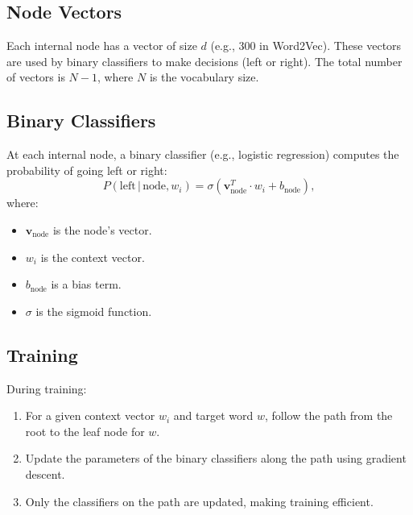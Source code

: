 \begin{notechapter}
\subsection{Node Vectors}
Each internal node has a vector of size \( d \) (e.g., 300
in Word2Vec). These vectors are used by binary classifiers
to make decisions (left or right). The total number of
vectors is \( N-1 \), where \( N \) is the vocabulary size.

\subsection{Binary Classifiers}
At each internal node, a binary classifier (e.g., logistic
regression) computes the probability of going left or right:
\[
P(\text{left} \,|\, \text{node}, w_i) = \sigma(\mathbf{v}_{\text{node}}^T
\cdot w_i + b_{\text{node}}),
\]
where:
\begin{itemize}
    \item \( \mathbf{v}_{\text{node}} \) is the node's vector.
    \item \( w_i \) is the context vector.
    \item \( b_{\text{node}} \) is a bias term.
    \item \( \sigma \) is the sigmoid function.
\end{itemize}

\subsection{Training}
During training:
\begin{enumerate}
    \item For a given context vector \( w_i \) and target word \( w \),
          follow the path from the root to the leaf node for \( w \).
    \item Update the parameters of the binary classifiers along the
          path using gradient descent.
    \item Only the classifiers on the path are updated, making
          training efficient.
\end{enumerate}


\end{notechapter}
